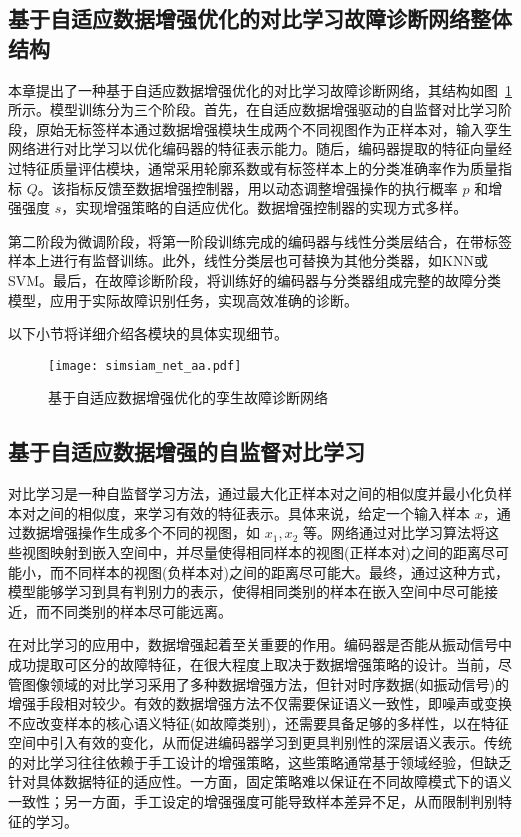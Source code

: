 \documentclass[master]{thesis-uestc}
\begin{document}
\subsection{基于自适应数据增强优化的对比学习故障诊断网络整体结构}

本章提出了一种基于自适应数据增强优化的对比学习故障诊断网络，其结构如图~\ref{simsiam_net}所示。模型训练分为三个阶段。首先，在自适应数据增强驱动的自监督对比学习阶段，原始无标签样本通过数据增强模块生成两个不同视图作为正样本对，输入孪生网络进行对比学习以优化编码器的特征表示能力。随后，编码器提取的特征向量经过特征质量评估模块，通常采用轮廓系数或有标签样本上的分类准确率作为质量指标 $Q$。该指标反馈至数据增强控制器，用以动态调整增强操作的执行概率 $p$ 和增强强度 $s$，实现增强策略的自适应优化。数据增强控制器的实现方式多样。


第二阶段为微调阶段，将第一阶段训练完成的编码器与线性分类层结合，在带标签样本上进行有监督训练。此外，线性分类层也可替换为其他分类器，如KNN或SVM。最后，在故障诊断阶段，将训练好的编码器与分类器组成完整的故障分类模型，应用于实际故障识别任务，实现高效准确的诊断。

以下小节将详细介绍各模块的具体实现细节。

\begin{figure}[h]
    \centering
    \texttt{[image: simsiam\_net\_aa.pdf]}
    \caption{基于自适应数据增强优化的孪生故障诊断网络}
    \label{simsiam_net}
\end{figure}
\FloatBarrier  %
\subsection{基于自适应数据增强的自监督对比学习}

对比学习是一种自监督学习方法，通过最大化正样本对之间的相似度并最小化负样本对之间的相似度，来学习有效的特征表示。具体来说，给定一个输入样本 $x$，通过数据增强操作生成多个不同的视图，如 $x_1, x_2$ 等。网络通过对比学习算法将这些视图映射到嵌入空间中，并尽量使得相同样本的视图(正样本对)之间的距离尽可能小，而不同样本的视图(负样本对)之间的距离尽可能大。最终，通过这种方式，模型能够学习到具有判别力的表示，使得相同类别的样本在嵌入空间中尽可能接近，而不同类别的样本尽可能远离。

在对比学习的应用中，数据增强起着至关重要的作用。编码器是否能从振动信号中成功提取可区分的故障特征，在很大程度上取决于数据增强策略的设计。当前，尽管图像领域的对比学习采用了多种数据增强方法，但针对时序数据(如振动信号)的增强手段相对较少。有效的数据增强方法不仅需要保证语义一致性，即噪声或变换不应改变样本的核心语义特征(如故障类别)，还需要具备足够的多样性，以在特征空间中引入有效的变化，从而促进编码器学习到更具判别性的深层语义表示。传统的对比学习往往依赖于手工设计的增强策略，这些策略通常基于领域经验，但缺乏针对具体数据特征的适应性。一方面，固定策略难以保证在不同故障模式下的语义一致性；另一方面，手工设定的增强强度可能导致样本差异不足，从而限制判别特征的学习。
\end{document}

